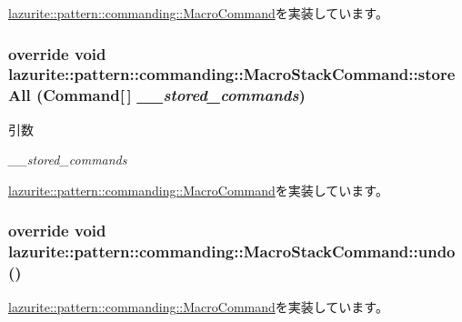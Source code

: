 \hyperlink{classlazurite_1_1pattern_1_1commanding_1_1_macro_command_a3c48d7d5dc8de76e3164794c9ac2f66f}{lazurite::pattern::commanding::MacroCommand}を実装しています。\hypertarget{classlazurite_1_1pattern_1_1commanding_1_1_macro_stack_command_a3f201d6f11d36c2609de0c31562268a8}{
\subsubsection[{storeAll}]{\setlength{\rightskip}{0pt plus 5cm}override void lazurite::pattern::commanding::MacroStackCommand::storeAll ({\bf Command}\mbox{[}$\,$\mbox{]} {\em \_\-\_\-stored\_\-commands})}}
\label{classlazurite_1_1pattern_1_1commanding_1_1_macro_stack_command_a3f201d6f11d36c2609de0c31562268a8}

\begin{DoxyParams}{引数}
\item[{\em \_\-\_\-stored\_\-commands}]\end{DoxyParams}


\hyperlink{classlazurite_1_1pattern_1_1commanding_1_1_macro_command_afa0d8581adff629f311bd109de0657b5}{lazurite::pattern::commanding::MacroCommand}を実装しています。\hypertarget{classlazurite_1_1pattern_1_1commanding_1_1_macro_stack_command_a6c2b7d10e92b11b774b2fcf0365f6a04}{
\subsubsection[{undo}]{\setlength{\rightskip}{0pt plus 5cm}override void lazurite::pattern::commanding::MacroStackCommand::undo ()}}
\label{classlazurite_1_1pattern_1_1commanding_1_1_macro_stack_command_a6c2b7d10e92b11b774b2fcf0365f6a04}


\hyperlink{classlazurite_1_1pattern_1_1commanding_1_1_macro_command_ae042e0f0207269ebb1c201ea39b860fb}{lazurite::pattern::commanding::MacroCommand}を実装しています。

